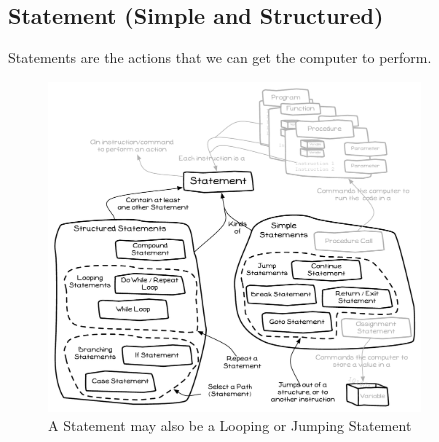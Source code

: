 \clearpage
\subsection{Statement (Simple and Structured)} %
\label{sub:statement_with_loops_}

Statements are the actions that we can get the computer to perform.  

\begin{figure}[h]
   \centering
   \includegraphics[width=0.88\textwidth]{./topics/control-flow/diagrams/Statement}
   \caption{A Statement may also be a Looping or Jumping Statement}
   \label{fig:looping-statement}
\end{figure}

